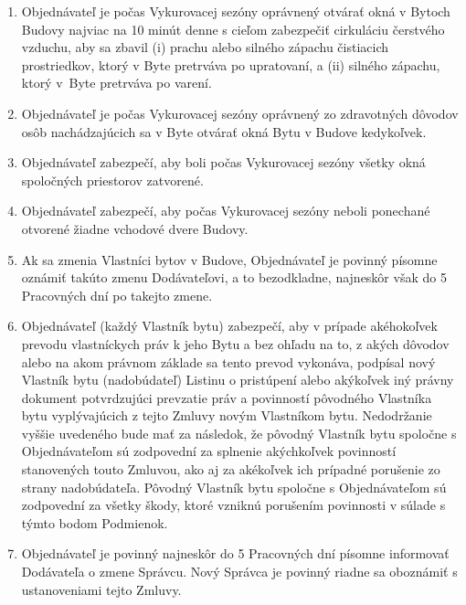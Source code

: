\begin{multicols}{2}
\begin{enumerate}
\item
  Objednávateľ je počas Vykurovacej sezóny oprávnený otvárať okná v
  Bytoch Budovy najviac na 10 minút denne s cieľom zabezpečiť cirkuláciu
  čerstvého vzduchu, aby sa zbavil (i) prachu alebo silného zápachu
  čistiacich prostriedkov, ktorý v Byte pretrváva po upratovaní, a (ii)
  silného zápachu, ktorý v~Byte pretrváva po varení.
\item
  Objednávateľ je počas Vykurovacej sezóny oprávnený zo zdravotných
  dôvodov osôb nachádzajúcich sa v Byte otvárať okná Bytu v Budove
  kedykoľvek.
\item
  Objednávateľ zabezpečí, aby boli počas Vykurovacej sezóny všetky okná
  spoločných priestorov zatvorené.
\item
  Objednávateľ zabezpečí, aby počas Vykurovacej sezóny neboli ponechané
  otvorené žiadne vchodové dvere Budovy.
\item
  Ak sa zmenia Vlastníci bytov v Budove, Objednávateľ je povinný písomne
  oznámiť takúto zmenu Dodávateľovi, a to bezodkladne, najneskôr však do
  5 Pracovných dní po takejto zmene.
\item
  Objednávateľ (každý Vlastník bytu) zabezpečí, aby v prípade
  akéhokoľvek prevodu vlastníckych práv k jeho Bytu a bez ohľadu na to,
  z akých dôvodov alebo na akom právnom základe sa tento prevod
  vykonáva, podpísal nový Vlastník bytu (nadobúdateľ) Listinu o
  pristúpení alebo akýkoľvek iný právny dokument potvrdzujúci prevzatie
  práv a povinností pôvodného Vlastníka bytu vyplývajúcich z tejto
  Zmluvy novým Vlastníkom bytu. Nedodržanie vyššie uvedeného bude mať za
  následok, že pôvodný Vlastník bytu spoločne s Objednávateľom sú
  zodpovední za splnenie akýchkoľvek povinností stanovených touto
  Zmluvou, ako aj za akékoľvek ich prípadné porušenie zo strany
  nadobúdateľa. Pôvodný Vlastník bytu spoločne s Objednávateľom sú
  zodpovední za všetky škody, ktoré vzniknú porušením povinnosti v
  súlade s týmto bodom Podmienok.
\item
  Objednávateľ je povinný najneskôr do 5 Pracovných dní písomne
  informovať Dodávateľa o zmene Správcu. Nový Správca je povinný riadne
  sa oboznámiť s ustanoveniami tejto Zmluvy.
\end{enumerate}


\end{multicols}

